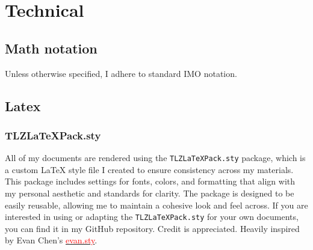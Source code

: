 \documentclass{article}
\begin{document}
\section{Technical}

\subsection{Math notation}
Unless otherwise specified, I adhere to standard IMO notation. 

\subsection{Latex}
\subsubsection{TLZLaTeXPack.sty}
All of my documents are rendered using the \texttt{TLZLaTeXPack.sty} package, which is a custom LaTeX style file I created to ensure consistency across my materials. This package includes settings for fonts, colors, and formatting that align with my personal aesthetic and standards for clarity.
The package is designed to be easily reusable, allowing me to maintain a cohesive look and feel across.
If you are interested in using or adapting the \texttt{TLZLaTeXPack.sty} for your own documents, you can find it in my GitHub repository. Credit is appreciated.
Heavily inspired by Evan Chen's \href{https://github.com/vEnhance/dotfiles/blob/main/texmf/tex/latex/evan/evan.sty}{\textcolor{red}{evan.sty}}.
\end{document}
